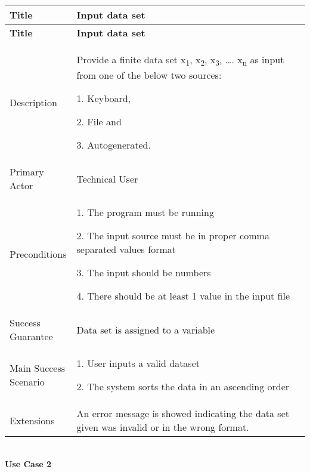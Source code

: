     \begin{longtable}{|p{0.227\linewidth}|p{0.773\linewidth}|}
    \hline
    \textbf{Title} & \textbf{Input data set} \\
    \hline
    \endfirsthead
    \hline
    \textbf{Title} & \textbf{Input data set} \\
    \hline
    \endhead
    \hline
    \endfoot
    \hline
    \endlastfoot
    Description & Provide a finite data set x\textsubscript{1},
    x\textsubscript{2}, x\textsubscript{3}, \ldots. x\textsubscript{n} as
    input from one of the below two sources:
    
    1. Keyboard,
    
    2. File and
    
    3. Autogenerated. \\ \hline
    Primary Actor & Technical User \\ \hline
    Preconditions & 1. The program must be running
    
    2. The input source must be in proper comma separated values format
    
    3. The input should be numbers
    
    4. There should be at least 1 value in the input file \\ \hline
    Success Guarantee & Data set is assigned to a variable \\ \hline
    Main Success Scenario & 1. User inputs a valid dataset
    
    2. The system sorts the data in an ascending order \\
    Extensions & An error message is showed indicating the data set given
    was invalid or in the wrong format.
    \end{longtable}
    \strut \\
    \textbf{\large Use Case 2}

